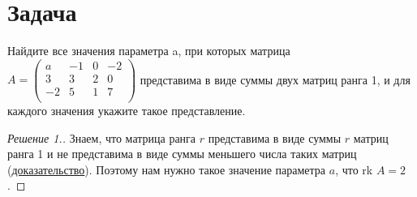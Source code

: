 \documentclass[a4paper]{article}
\theoremstyle{remark}
\begin{document}
    \section*{Задача }
        Найдите все значения параметра a, при которых матрица $A = 
        \begin{pmatrix}
            a & -1 & 0 & -2 \\ 
            3 & 3 & 2 & 0 \\ 
            -2 & 5 & 1 & 7 \\ 
        \end{pmatrix} 
        $
        представима в виде суммы двух матриц ранга 1, и для каждого 
        значения укажите такое представление.
	    \begin{proof}[Решение 1.]
            Знаем, что матрица ранга $r$ представима в виде суммы $r$ матриц ранга 1 и не представима
            в виде суммы меньшего числа таких матриц 
            (\href{https://www.youtube.com/watch?v=RgIt32Bc_gc&t=1h0m21s}{доказательство}). 
            Поэтому нам нужно такое значение параметра $a$, что rk $A = 2$. 


\end{proof}
\end{document}
